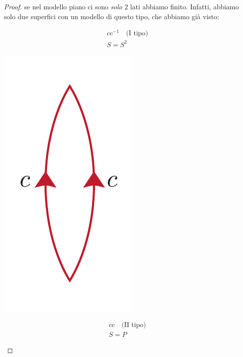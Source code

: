 \begin{proof}{}
 se nel modello piano ci sono \textit{solo} $2$ lati abbiamo finito. Infatti, abbiamo solo due superfici con un modello di questo tipo, che abbiamo già visto:
\begin{center}
	\begin{minipage}{.19\linewidth}
		\begin{equation*}
			\begin{array}{cc}
				cc^{-1}\quad \text{(I tipo)}\\
				S=S^2
			\end{array}
		\end{equation*}
	\end{minipage}
	\begin{minipage}{.20\linewidth}
		\begin{center}
			\includegraphics[trim=0cm 0cm 0cm 0cm, clip, scale=0.35]{images/sphere2lines.pdf}
		\end{center}
	\end{minipage}
	\begin{minipage}{.19\linewidth}
		\begin{equation*}
			\begin{array}{cc}
				cc\quad \text{(II tipo)}\\
				S=P
			\end{array}

\end{equation*}
\end{minipage}
\end{center}
\end{proof}
